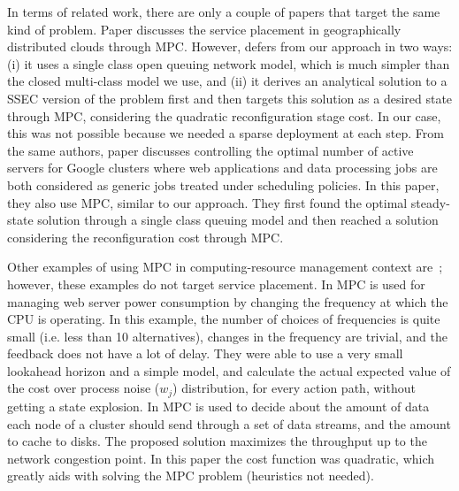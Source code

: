 In terms of related work, there are only a couple of papers that  target the same kind of problem.
Paper \cite{zhang2012dynamicPlacement} discusses the service placement in geographically distributed clouds through MPC. However, \cite{zhang2012dynamicPlacement} defers from our approach in two ways: (i) it uses a single class open queuing network model, which is much simpler than the closed multi-class model we use, and (ii) it derives an analytical solution to a SSEC version of the problem first and then targets this solution as a desired state through MPC, considering the
quadratic reconfiguration stage cost. In our case, this was not possible because we needed a sparse deployment at each step. From the same authors, paper \cite{zhang2012dynamicProvisioning} discusses controlling the optimal number of active servers for Google clusters where web applications and data processing jobs are both considered as generic jobs treated under scheduling policies. In this paper, they also use MPC, similar to our approach. They first found the optimal steady-state solution through a single class queuing model and then reached a solution considering the reconfiguration cost through MPC.

Other examples of using MPC in computing-resource management context are~\cite{baiefficient,abdelwahed2004control, kandasamy2004self, bhat2006enabling,patikirikorala2011hammerstein}; however, these examples do not target service placement.
In \cite{baiefficient,abdelwahed2004control,kandasamy2004self} MPC is used for managing web server power consumption by changing the frequency at which the CPU is operating. 
In this example, the number of choices of frequencies is quite small (i.e. less than 10 alternatives), changes in the frequency are trivial, and the feedback does not have a lot of delay. 
They were able to use a very small lookahead horizon and a simple model, and calculate the actual expected value of the cost over process noise ($w_j$) distribution, for every action path, without getting a state explosion.  
In \cite{bhat2006enabling} MPC is used to decide about the amount of data each node of a cluster should send through a set of data streams, and the amount to cache to disks. The proposed solution maximizes the throughput up to the network congestion point. In this paper the cost function was quadratic, which greatly aids with solving the MPC problem (heuristics not needed).   

